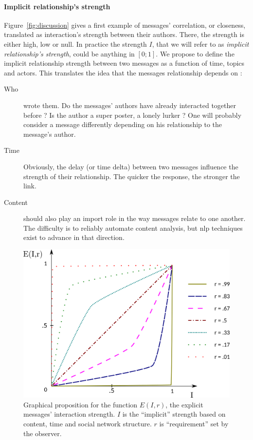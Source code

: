 \documentclass[a4paper,twoside]{article}
\begin{document}
\paragraph{Implicit relationship's strength}
Figure~\ref{fig:discussion} gives a first example of messages' correlation, or closeness, translated as interaction's strength between their authors.  There, the strength is either high, low or null.  In practice the strength $I$, that we will refer to as \emph{implicit relationship's strength}, could be anything in $[0;1]$.
We propose to define the implicit relationship strength between two messages as a function of time, topics and actors.  This translates the idea that the messages relationship depends on :
\begin{description}
\item[{Who}] wrote them.  Do the messages' authors have already interacted together before ? Is the author a super poster, a lonely lurker ? One will probably consider a message differently depending on his relationship to the message's author.
\item[{Time}] Obviously, the delay (or time delta) between two messages influence the strength of their relationship.  The quicker the response, the stronger the link.
\item[{Content}] should also play an import role in the way messages relate to one another.  The difficulty is to reliably automate content analysis, but \gls{nlp} techniques exist to advance in that direction.
 
\end{description}
\begin{figure}[b]
 \small{
  \caption{\label{fig:func} Graphical proposition for the function $E(I,r)$, the explicit messages' interaction strength.  $I$ is the ``implicit'' strength based on content, time and social network structure.  $r$ is ``requirement'' set by the observer.}}
 \includegraphics[width=.5\textwidth]{images/func.png}
\end{figure}
\end{document}
